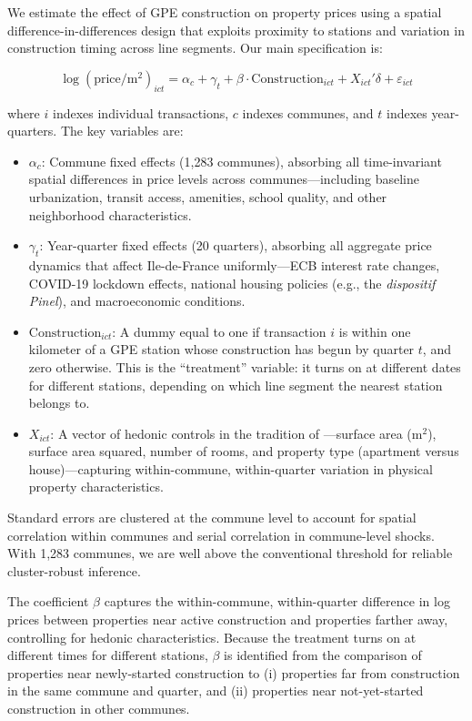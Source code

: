 \documentclass[12pt]{article}
\begin{document}
We estimate the effect of GPE construction on property prices using a spatial difference-in-differences design that exploits proximity to stations and variation in construction timing across line segments. Our main specification is:

\begin{equation}
\label{eq:main}
\log(\text{price}/\text{m}^2)_{ict} = \alpha_c + \gamma_t + \beta \cdot \text{Construction}_{ict} + X_{ict}'\delta + \varepsilon_{ict}
\end{equation}

\noindent where $i$ indexes individual transactions, $c$ indexes communes, and $t$ indexes year-quarters. The key variables are:

\begin{itemize}
\item $\alpha_c$: Commune fixed effects (1,283 communes), absorbing all time-invariant spatial differences in price levels across communes---including baseline urbanization, transit access, amenities, school quality, and other neighborhood characteristics.
\item $\gamma_t$: Year-quarter fixed effects (20 quarters), absorbing all aggregate price dynamics that affect Ile-de-France uniformly---ECB interest rate changes, COVID-19 lockdown effects, national housing policies (e.g., the \textit{dispositif Pinel}), and macroeconomic conditions.
\item $\text{Construction}_{ict}$: A dummy equal to one if transaction $i$ is within one kilometer of a GPE station whose construction has begun by quarter $t$, and zero otherwise. This is the ``treatment'' variable: it turns on at different dates for different stations, depending on which line segment the nearest station belongs to.
\item $X_{ict}$: A vector of hedonic controls in the tradition of \citet{rosen1974hedonic}---surface area (m$^2$), surface area squared, number of rooms, and property type (apartment versus house)---capturing within-commune, within-quarter variation in physical property characteristics.
\end{itemize}

Standard errors are clustered at the commune level to account for spatial correlation within communes and serial correlation in commune-level shocks. With 1,283 communes, we are well above the conventional threshold for reliable cluster-robust inference.

The coefficient $\beta$ captures the within-commune, within-quarter difference in log prices between properties near active construction and properties farther away, controlling for hedonic characteristics. Because the treatment turns on at different times for different stations, $\beta$ is identified from the comparison of properties near newly-started construction to (i) properties far from construction in the same commune and quarter, and (ii) properties near not-yet-started construction in other communes.
\end{document}

